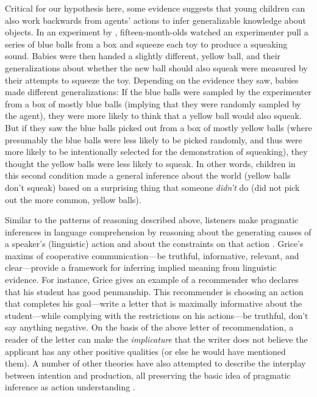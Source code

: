 \documentclass[man]{apa2}
\begin{document}
Critical for our hypothesis here, some evidence suggests that young children can also work backwards from agents' actions to infer generalizable knowledge about objects. In an experiment by , fifteen-month-olds watched an experimenter pull a series of blue balls from a box and squeeze each toy to produce a squeaking sound. Babies were then handed a slightly different, yellow ball, and their generalizations about whether the new ball should also squeak were measured by their attempts to squeeze the toy. Depending on the evidence they saw, babies made different generalizations: If the blue balls were sampled by the experimenter from a box of mostly blue balls (implying that they were randomly sampled by the agent), they were more likely to think that a yellow ball would also squeak. But if they saw the blue balls picked out from a box of mostly yellow balls (where presumably the blue balls were less likely to be picked randomly, and thus were more likely to be intentionally selected for the demonstration of squeaking), they thought the yellow balls were less likely to squeak. In other words, children in this second condition made a general inference about the world (yellow balls don't squeak) based on a surprising thing that someone \emph{didn't} do (did not pick out the more common, yellow balls). 


Similar to the patterns of reasoning described above, listeners make pragmatic inferences in language comprehension by reasoning about the generating causes of a speaker's (linguistic) action and about the constraints on that action \cite{shafto2012}. Grice's \citeyear{grice1975} maxims of cooperative communication---be truthful, informative, relevant, and clear---provide a framework for inferring implied meaning from linguistic evidence. For instance, Grice gives an example of a recommender who declares that his student has good penmanship. This recommender is choosing an action that completes his goal---write a letter that is maximally informative about the student---while complying with the restrictions on his actions---be truthful, don't say anything negative. On the basis of the above letter of recommendation, a reader of the letter can make the \emph{implicature} that the writer does not believe the applicant has any other positive qualities (or else he would have mentioned them). A number of other theories have also attempted to describe the interplay between intention and production, all preserving the basic idea of pragmatic inference as action understanding \cite{horn1984,clark1996,levinson2000}. 
\end{document}

